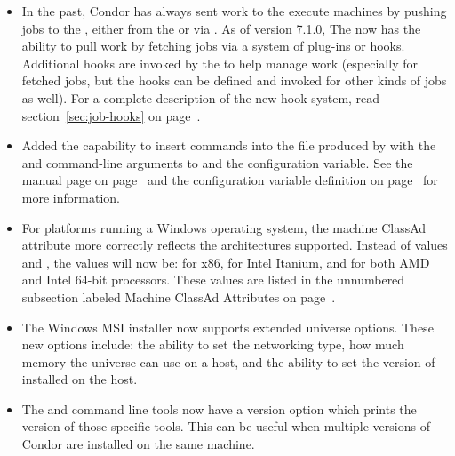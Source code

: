 \begin{itemize}

\item In the past, Condor has always sent work to the execute machines
  by pushing jobs to the , either from the
   or via .
  As of version 7.1.0, The  now has the ability to pull
  work by fetching jobs via a system of plug-ins or hooks.
  Additional hooks are invoked by the  to help manage
  work (especially for fetched jobs, but the  hooks
  can be defined and invoked for other kinds of jobs as well).
  For a complete description of the new hook system, read
  section~\ref{sec:job-hooks} on page~\pageref{sec:job-hooks}.

\item Added the capability to insert commands into the 
  file produced by  with the  and
   command-line arguments to  and
  the  configuration variable.
  See the  manual page on
  page~\pageref{man-condor-submit-dag}
  and the configuration variable definition on
  page~\pageref{param:DAGManInsertSubFile} for more information.

\item For platforms running a Windows operating system, the 
  machine ClassAd attribute more correctly reflects the architectures
  supported.  Instead of values  and ,
  the values will now be:  for x86,
   for Intel Itanium,
  and  for both AMD and Intel 64-bit processors.
  These values are listed in the unnumbered subsection labeled
  Machine ClassAd Attributes on page~\pageref{sec:Machine-ClassAd-Attributes}.

\item The Windows MSI installer now supports extended  universe 
  options. These new options include: the ability to set the 
  networking type, how much memory the  universe can use 
  on a host, and
  the ability to set the version of  installed on the host.

\item The  and  command line tools now have a
  version option which prints the version of those specific tools.  This
  can be useful when multiple versions of Condor are installed on the
  same machine.


\end{itemize}
